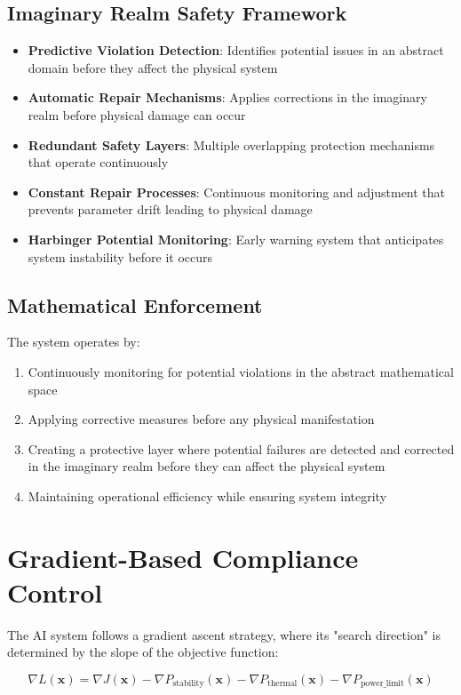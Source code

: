 \documentclass[12pt]{article}
\begin{document}
\subsection{Imaginary Realm Safety Framework}
\begin{itemize}
    \item \textbf{Predictive Violation Detection}: Identifies potential issues in an abstract domain before they affect the physical system
    \item \textbf{Automatic Repair Mechanisms}: Applies corrections in the imaginary realm before physical damage can occur
    \item \textbf{Redundant Safety Layers}: Multiple overlapping protection mechanisms that operate continuously
    \item \textbf{Constant Repair Processes}: Continuous monitoring and adjustment that prevents parameter drift leading to physical damage
    \item \textbf{Harbinger Potential Monitoring}: Early warning system that anticipates system instability before it occurs
\end{itemize}

\subsection{Mathematical Enforcement}
The system operates by:
\begin{enumerate}
    \item Continuously monitoring for potential violations in the abstract mathematical space
    \item Applying corrective measures before any physical manifestation
    \item Creating a protective layer where potential failures are detected and corrected in the imaginary realm before they can affect the physical system
    \item Maintaining operational efficiency while ensuring system integrity
\end{enumerate}

\section{Gradient-Based Compliance Control}

The AI system follows a gradient ascent strategy, where its "search direction" is determined by the slope of the objective function:

\begin{equation}
\nabla L(\mathbf{x}) = \nabla J(\mathbf{x}) - \nabla P_{\text{stability}}(\mathbf{x}) - \nabla P_{\text{thermal}}(\mathbf{x}) - \nabla P_{\text{power\_limit}}(\mathbf{x})
\end{equation}
\end{document}
